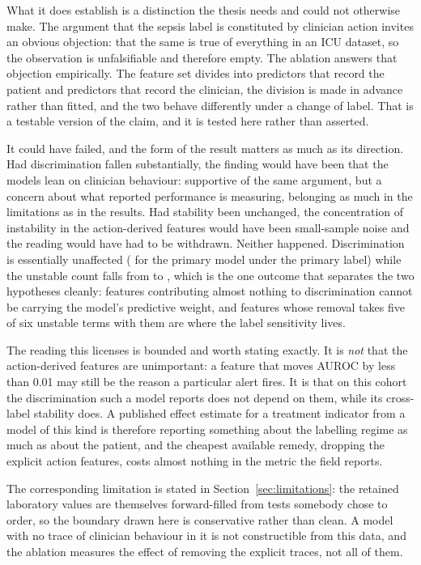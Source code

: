 What it does establish is a distinction the thesis needs and could not
otherwise make. The argument that the sepsis label is constituted by clinician
action invites an obvious objection: that the same is true of everything in an
ICU dataset, so the observation is unfalsifiable and therefore empty. The
ablation answers that objection empirically. The feature set divides into
predictors that record the patient and predictors that record the clinician,
the division is made in advance rather than fitted, and the two behave
differently under a change of label. That is a testable version of the claim,
and it is tested here rather than asserted.

It could have failed, and the form of the result matters as much as its
direction. Had discrimination fallen substantially, the finding would have been
that the models lean on clinician behaviour: supportive of the same argument,
but a concern about what reported performance is measuring, belonging as much in
the limitations as in the results. Had stability been unchanged, the
concentration of instability in the action-derived features would have been
small-sample noise and the reading would have had to be withdrawn. Neither
happened. Discrimination is essentially unaffected
(\pcAblDeltaAurocPrimaryB{} for the primary model under the primary label) while
the unstable count falls from \pcHTwoEst{} to \pcAblHTwoNUnstable, which is the
one outcome that separates the two hypotheses cleanly: features contributing
almost nothing to discrimination cannot be carrying the model's predictive
weight, and features whose removal takes five of six unstable terms with them
are where the label sensitivity lives.

The reading this licenses is bounded and worth stating exactly. It is
\emph{not} that the action-derived features are unimportant: a feature that
moves AUROC by less than 0.01 may still be the reason a particular alert fires.
It is that on this cohort the discrimination such a model reports does not
depend on them, while its cross-label stability does. A published effect
estimate for a treatment indicator from a model of this kind is therefore
reporting something about the labelling regime as much as about the patient, and
the cheapest available remedy, dropping the explicit action features, costs
almost nothing in the metric the field reports.

The corresponding limitation is stated in Section~\ref{sec:limitations}: the
retained laboratory values are themselves forward-filled from tests somebody
chose to order, so the boundary drawn here is conservative rather than clean. A
model with no trace of clinician behaviour in it is not constructible from this
data, and the ablation measures the effect of removing the explicit traces, not
all of them.


